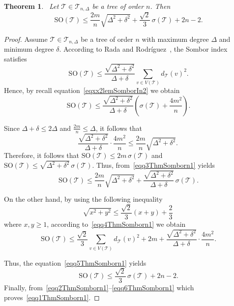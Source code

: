 \documentclass[12pt, a4paper]{article}
\newtheorem{theorem}{Theorem}[section]
\newcommand{\TT}{\mathcal{T}}
\newcommand{\SO}{\mathrm{SO}}
\begin{document}
\begin{theorem}~\label{ThmSomborn1}
Let $\TT\in \mathcal{T}_{n,\Delta}$ be a tree of order $n$.
Then
\begin{equation}~\label{eqq1ThmSomborn1}
\SO(\TT)\leqslant \frac{2m}{n}\sqrt{\Delta^2+\delta^2}
+\frac{\sqrt{2}}{3}\,\sigma(\TT)+2n-2.
\end{equation}
\end{theorem}
\begin{proof}
Assume $\TT\in \mathcal{T}_{n,\Delta}$ be a tree of order $n$ with maximum
degree $\Delta$ and minimum degree $\delta$. According to Rada and Rodríguez~\cite{Rada21Rodriguez}, the Sombor index
satisfies
\begin{equation}~\label{eqq2ThmSomborn1}
\SO(\TT)\leqslant
\frac{\sqrt{\Delta^2+\delta^2}}{\Delta+\delta}
\sum_{v\in V(\TT)} d_\TT(v)^2.
\end{equation}
Hence, by recall equation~\eqref{eqxx2lemSomborIn2} we obtain
\begin{equation}~\label{eqq3ThmSomborn1}
\SO(\TT)
\leqslant
\frac{\sqrt{\Delta^2+\delta^2}}{\Delta+\delta}
\left(\sigma(\TT)+\frac{4m^2}{n}\right).
\end{equation}

Since $\Delta+\delta\leqslant 2\Delta$ and $\frac{2m}{n}\leqslant\Delta$,
it follows that
\[
\frac{\sqrt{\Delta^2+\delta^2}}{\Delta+\delta}
\cdot\frac{4m^2}{n}
\leqslant
\frac{2m}{n}\sqrt{\Delta^2+\delta^2}.
\]
Therefore, it follows that $\SO(\TT)\leqslant 2m\, \sigma(\TT)$ and $\SO(\TT)\leqslant \sqrt{\Delta^2+\delta^2}\, \sigma(\TT)$. Thus, from~\eqref{eqq3ThmSomborn1} yields 
\begin{equation}~\label{eqq4ThmSomborn1}
\SO(\TT)
\leqslant
\frac{2m}{n}\sqrt{\Delta^2+\delta^2}
+
\frac{\sqrt{\Delta^2+\delta^2}}{\Delta+\delta}\,
\sigma(\TT).
\end{equation}

On the other hand, by using the following inequality
\[
\sqrt{x^2+y^2}\leqslant \frac{\sqrt{2}}{3}(x+y)+\frac{2}{3}
\]
where $x,y\geqslant 1$, according to~\eqref{eqq4ThmSomborn1} we obtain
\begin{equation}~\label{eqq5ThmSomborn1}
\SO(\TT)
\leqslant
\frac{\sqrt{2}}{3}\sum_{v\in V(\TT)} d_\TT(v)^2+2m+\frac{\sqrt{\Delta^2+\delta^2}}{\Delta+\delta}
\cdot\frac{4m^2}{n}.
\end{equation}

Thus, the equation~\eqref{eqq5ThmSomborn1} yields
\begin{equation}~\label{eqq6ThmSomborn1}
\SO(\TT)
\leqslant
\frac{\sqrt{2}}{3}\,\sigma(\TT)+2n-2.
\end{equation}
Finally, from~\eqref{eqq2ThmSomborn1}--\eqref{eqq6ThmSomborn1} which proves~\eqref{eqq1ThmSomborn1}.
\end{proof}
\end{document}
